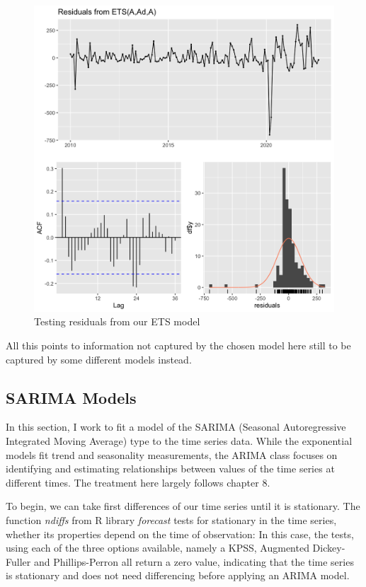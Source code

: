\documentclass[conference]{IEEEtran}
\begin{document}
\begin{figure}[htbp]
\centerline{\includegraphics[scale=0.25]{ETS_residuals.png}}
\caption{Testing residuals from our ETS model}
\label{fig:ETS_residuals}
\end{figure}

All this points to information not captured by the chosen model here still to be captured by some different models instead. 

\subsection{SARIMA Models}
\label{sec:arima}

In this section, I work to fit a model of the SARIMA (Seasonal Autoregressive Integrated Moving Average) type to the time series data.  While the exponential models fit trend and seasonality measurements, the ARIMA class focuses on identifying and estimating relationships between values of the time series at different times.  The treatment here largely follows \cite{fpp2} chapter 8.  

To begin, we can take first differences of our time series until it is stationary.  The function \textit{ndiffs} from R library \textit{forecast} tests for stationary in the time series, whether its properties depend on the time of observation:  In this case, the tests, using each of the three options available, namely a KPSS, Augmented Dickey-Fuller and  Phillips-Perron all return a zero value, indicating that the time series is stationary and does not need differencing before applying an ARIMA model.  
\end{document}
